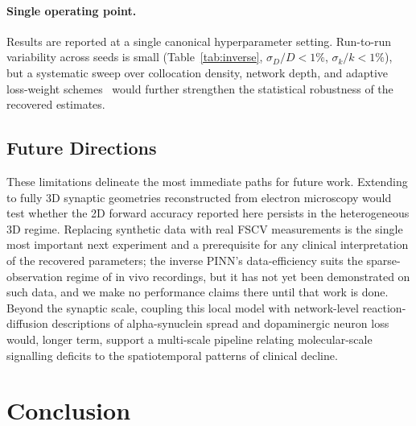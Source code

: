 \documentclass[12pt]{article}
\begin{document}
\paragraph{Single operating point.}
Results are reported at a single canonical hyperparameter
setting. Run-to-run variability across seeds is small
(Table~\ref{tab:inverse}, $\sigma_D/D < 1\%$,
$\sigma_k/k < 1\%$), but a systematic sweep over collocation
density, network depth, and adaptive loss-weight
schemes~\cite{Wang2021} would further strengthen the
statistical robustness of the recovered estimates.

\subsection{Future Directions}
\label{sec:disc_future}

These limitations delineate the most immediate paths for future
work. Extending to fully 3D synaptic geometries reconstructed
from electron microscopy would test whether the 2D forward
accuracy reported here persists in the heterogeneous 3D regime.
Replacing synthetic data with real FSCV measurements
\cite{Rodeberg2017} is the single most important next
experiment and a prerequisite for any clinical interpretation
of the recovered parameters; the inverse PINN's data-efficiency
suits the sparse-observation regime of in vivo recordings, but
it has not yet been demonstrated on such data, and we make no
performance claims there until that work is done. Beyond the
synaptic scale, coupling this local model with network-level
reaction-diffusion descriptions of alpha-synuclein spread and
dopaminergic neuron loss~\cite{Garcia2017, Corti2023,
Pandya2019} would, longer term, support a multi-scale pipeline
relating molecular-scale signalling deficits to the
spatiotemporal patterns of clinical decline.

\section{Conclusion}
\label{sec:conclusion}
\end{document}
